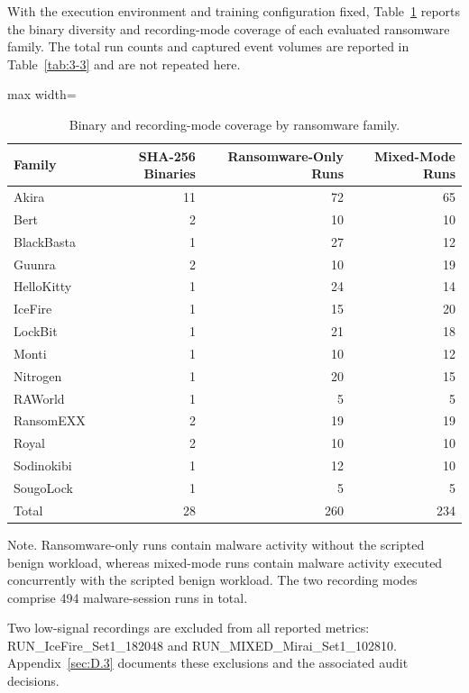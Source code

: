With the execution environment and training configuration fixed, Table~\ref{tab:4-3} reports the binary diversity and recording-mode coverage of each evaluated ransomware family. The total run counts and captured event volumes are reported in Table~\ref{tab:3-3} and are not repeated here.

\begin{table}[htbp]
\centering
\caption{Binary and recording-mode coverage by ransomware family.}\label{tab:4-3}
\begin{adjustbox}{max width=\textwidth}
\begin{tabular}{lrrr}
\hline
\textbf{Family} & \textbf{SHA-256 Binaries} & \textbf{Ransomware-Only Runs} & \textbf{Mixed-Mode Runs} \\
\hline
Akira & 11 & 72 & 65 \\
Bert & 2 & 10 & 10 \\
BlackBasta & 1 & 27 & 12 \\
Guunra & 2 & 10 & 19 \\
HelloKitty & 1 & 24 & 14 \\
IceFire & 1 & 15 & 20 \\
LockBit & 1 & 21 & 18 \\
Monti & 1 & 10 & 12 \\
Nitrogen & 1 & 20 & 15 \\
RAWorld & 1 & 5 & 5 \\
RansomEXX & 2 & 19 & 19 \\
Royal & 2 & 10 & 10 \\
Sodinokibi & 1 & 12 & 10 \\
SougoLock & 1 & 5 & 5 \\
Total & 28 & 260 & 234 \\
\hline
\end{tabular}
\end{adjustbox}
\end{table}

Note. Ransomware-only runs contain malware activity without the scripted benign workload, whereas mixed-mode runs contain malware activity executed concurrently with the scripted benign workload. The two recording modes comprise 494 malware-session runs in total.

Two low-signal recordings are excluded from all reported metrics: RUN\_\allowbreak{}IceFire\_\allowbreak{}Set1\_\allowbreak{}182048 and RUN\_\allowbreak{}MIXED\_\allowbreak{}Mirai\_\allowbreak{}Set1\_\allowbreak{}102810. Appendix~\ref{sec:D.3} documents these exclusions and the associated audit decisions.

